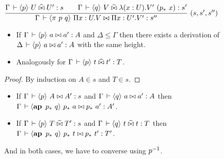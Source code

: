 \documentclass[a4paper,english]{lipics-utf8x}
\begin{document}
  \begin{center}
  \(
    \rux{\Gamma \der \hideq{p} U \hEr U' : s \qquad
          \Gamma \der \hideq{q} V \hEr \lambda (x:U). V'\ (p_*\ x) : s'
        }{\Gamma \der \hideq{\pi\ p\ q} \Pi x:U.V \Er \Pi x:U'.V' : s''
        }{(s,s',s'')}
  \)
  \end{center}

  \begin{mathc}
  \end{mathc}

  \begin{lemma}[Weakening]
    \leavevmode
    \begin{itemize}
      \item If $\Gamma \,\vdash \langle p \rangle~ a \mathrel{\bowtie} a' : A$ and $\Delta \le \Gamma$ then
      there exists a derivation of $\Delta \,\vdash \langle p \rangle~ a \mathrel{\bowtie} a' : A$ with the
      same height.
      \item Analogously for $\Gamma \,\vdash \langle p \rangle~ t \mathrel{\widehat{\bowtie}} t' : T$.
    \end{itemize}
  \end{lemma}
  \begin{proof}
    By induction on $A \in s$ and $T \in s$.
  \end{proof}

  \begin{lemma}
    \label{lem:s-conv}
    \leavevmode
    \begin{itemize}
      \item If $\Gamma \,\vdash \langle p \rangle~ A \mathrel{\bowtie} A' : s$ and
      $\Gamma \,\vdash \langle q \rangle~ a \mathrel{\bowtie} a' : A$ then
      $\Gamma \der \hideq{\ap p_*\ q} p_*\ a \Er p_*\ a' : A'$.
      \item If $\Gamma \,\vdash \langle p \rangle~ T \mathrel{\widehat{\bowtie}} T' : s$ and
      $\Gamma \,\vdash \langle q \rangle~ t \mathrel{\widehat{\bowtie}} t : T$ then
      $\Gamma \der \hideq{\ap p_*\ q} p_*\ t \Er p_*\ t' : T'$.
    \end{itemize}
    And in both cases, we have to converse using $p^{-1}$.
  \end{lemma}
\end{document}
